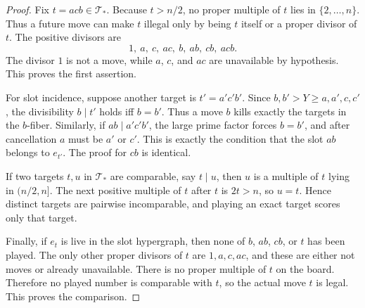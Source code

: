 \begin{proof}
Fix $t=acb\in\mathcal T_*$.  Because $t>n/2$, no proper multiple of $t$ lies in
$\{2,\dots,n\}$.  Thus a future move can make $t$ illegal only by being $t$
itself or a proper divisor of $t$.  The positive divisors are
\[
  1,\ a,\ c,\ ac,\ b,\ ab,\ cb,\ acb.
\]
The divisor $1$ is not a move, while $a$, $c$, and $ac$ are unavailable by
hypothesis.  This proves the first assertion.

For slot incidence, suppose another target is $t'=a'c'b'$.  Since
$b,b'>Y\ge a,a',c,c'$, the divisibility $b\mid t'$ holds iff $b=b'$.  Thus a
move $b$ kills exactly the targets in the $b$-fiber.  Similarly, if
$ab\mid a'c'b'$, the large prime factor forces $b=b'$, and after cancellation
$a$ must be $a'$ or $c'$.  This is exactly the condition that the slot $ab$
belongs to $e_{t'}$.  The proof for $cb$ is identical.

If two targets $t,u$ in $\mathcal T_*$ are comparable, say $t\mid u$, then
$u$ is a multiple of $t$ lying in $(n/2,n]$.  The next positive multiple of
$t$ after $t$ is $2t>n$, so $u=t$.  Hence distinct targets are pairwise
incomparable, and playing an exact target scores only that target.

Finally, if $e_t$ is live in the slot hypergraph, then none of $b$, $ab$, $cb$,
or $t$ has been played.  The only other proper divisors of $t$ are
$1,a,c,ac$, and these are either not moves or already unavailable.  There is no
proper multiple of $t$ on the board.  Therefore no played number is comparable
with $t$, so the actual move $t$ is legal.  This proves the comparison.
\end{proof}

